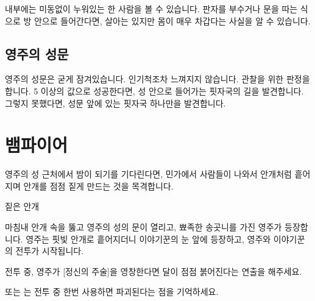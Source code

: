 \documentclass{report}
\begin{document}
	내부에는 미동없이 누워있는 한 사람을 볼 수 있습니다. 판자를 부수거나 문을 따는 식으로 방 안으로 들어간다면, 살아는 있지만 몸이 매우 차갑다는 사실을 알 수 있습니다.
	
	\subsection{영주의 성문}
	영주의 성문은 굳게 잠겨있습니다. 인기척조차 느껴지지 않습니다. 관찰을 위한 판정을 합니다. 5 이상의 값으로 성공한다면, 성 안으로 들어가는 핏자국의 길을 발견합니다. 그렇지 못했다면, 성문 앞에 있는 핏자국 하나만을 발견합니다.
	
	\section{뱀파이어}
	영주의 성 근처에서 밤이 되기를 기다린다면, 민가에서 사람들이 나와서 안개처럼 흩어지며 안개를 점점 짙게 만드는 것을 목격합니다.
	
	\begin{spoil}{짙은 안개}
	\end{spoil}
	
	마침내 안개 속을 뚫고 영주의 성의 문이 열리고, 뾰족한 송곳니를 가진 영주가 등장합니다. 영주는 핏빛 안개로 흩어지더니 이야기꾼의 눈 앞에 등장하고, 영주와 이야기꾼의 전투가 시작됩니다.
	
	전투 중, 영주가 [정신의 주술]을 영창한다면 달이 점점 붉어진다는 연출을 해주세요.
	
	 또는 는 전투 중 한번 사용하면 파괴된다는 점을 기억하세요.
	
\end{document}
